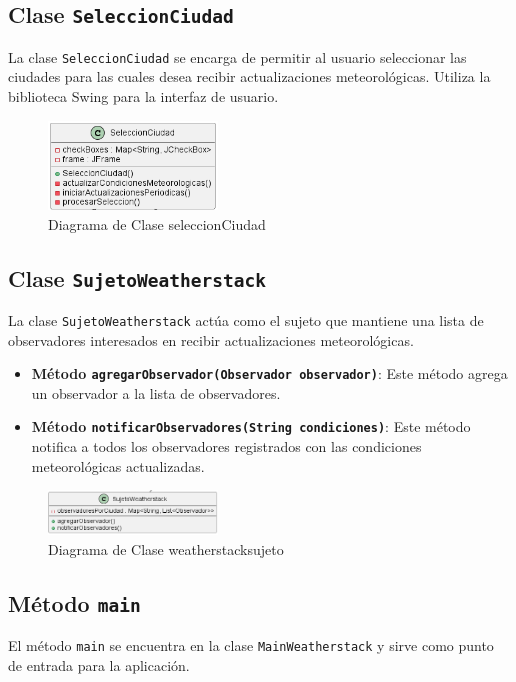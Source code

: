 \documentclass{article}
\begin{document}
\subsection{Clase \texttt{SeleccionCiudad}}
La clase \texttt{SeleccionCiudad} se encarga de permitir al usuario seleccionar las ciudades para las cuales desea recibir actualizaciones meteorológicas. Utiliza la biblioteca Swing para la interfaz de usuario.
\begin{figure}[H]
    \centering
    \includegraphics[width=0.4\textwidth]{seleccionCiudad.png}
    \caption{Diagrama de Clase seleccionCiudad}
    \label{figura:seleccionCiudad}
\end{figure}
\subsection{Clase \texttt{SujetoWeatherstack}}
La clase \texttt{SujetoWeatherstack} actúa como el sujeto que mantiene una lista de observadores interesados en recibir actualizaciones meteorológicas.

\begin{itemize}
    \item \textbf{Método \texttt{agregarObservador(Observador observador)}}: Este método agrega un observador a la lista de observadores.
    \item \textbf{Método \texttt{notificarObservadores(String condiciones)}}: Este método notifica a todos los observadores registrados con las condiciones meteorológicas actualizadas.
\end{itemize}

\begin{figure}[H]
    \centering
    \includegraphics[width=0.4\textwidth]{weatherstacksujeto.png}
    \caption{Diagrama de Clase weatherstacksujeto}
    \label{figura:weatherstacksujeto}
\end{figure}
\subsection{Método \texttt{main}}
El método \texttt{main} se encuentra en la clase \texttt{MainWeatherstack} y sirve como punto de entrada para la aplicación.
\end{document}
